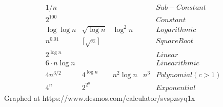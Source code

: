 \documentclass[11pt]{article}
\begin{document}
\begin{enumerate}[leftmargin=*]
    \begin{equation*}
            \begin{array}{ccccc}
                1/n & & & & Sub-Constant \\
                2^{100} & & & & Constant \\
                \log \log n & \sqrt{\log n} & \log^2 n & & Logarithmic \\
                n^{0.01} & \lceil\sqrt{n}\rceil & & & Square Root \\
                2^{\log n} & & & & Linear \\
                6 \cdot n\log n & & & & Linearithmic \\
                4n^{3/2} & 4^{\log n} & n^2\log n & n^3 & Polynomial (c>1) \\
                4^n & 2^{2^n} & & & Exponential
            \end{array}           
        \end{equation*}
        Graphed at https://www.desmos.com/calculator/svspzsyq1x


\end{enumerate}
\end{document}
